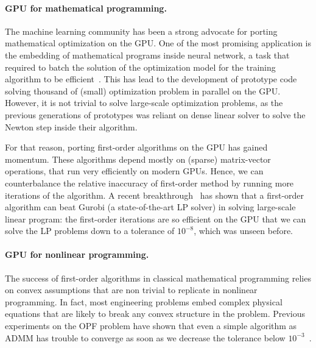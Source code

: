 \paragraph{GPU for mathematical programming.}
The machine learning community has been a strong advocate
for porting mathematical optimization on the GPU. One of the most
promising application is the embedding of mathematical programs
inside neural network, a task that required to batch the solution
of the optimization model for the training algorithm to be efficient~\cite{amos2017optnet,pineda2022theseus}.
This has lead to the development of prototype code solving
thousand of (small) optimization problem in parallel on the GPU.
However, it is not trivial to solve large-scale optimization problems,
as the previous generations of prototypes was reliant on dense linear solver
to solve the Newton step inside their algorithm.

For that reason, porting first-order algorithms on the GPU
has gained momentum.
These algorithms depend mostly on (sparse) matrix-vector operations, that run
very efficiently on modern GPUs. Hence, we can counterbalance
the relative inaccuracy of first-order method by running more
iterations of the algorithm.
A recent breakthrough~\cite{lu2023cupdlp,lu2023cupdlp2} has shown that a first-order algorithm
can beat Gurobi (a state-of-the-art LP solver) in solving large-scale linear program:
the first-order iterations are so efficient on the GPU that we can solve the
LP problems down to a tolerance of $10^{-8}$, which was unseen before.


\paragraph{GPU for nonlinear programming.}
The success of first-order algorithms in classical mathematical programming
relies on convex assumptions that are non trivial to replicate
in nonlinear programming. In fact, most engineering problems embed complex
physical equations that are likely to break any convex structure in  the problem.
Previous experiments on the OPF problem have shown that even a simple
algorithm as ADMM has trouble to converge as soon as we decrease the
tolerance below $10^{-3}$~\cite{kim2021leveraging}.

